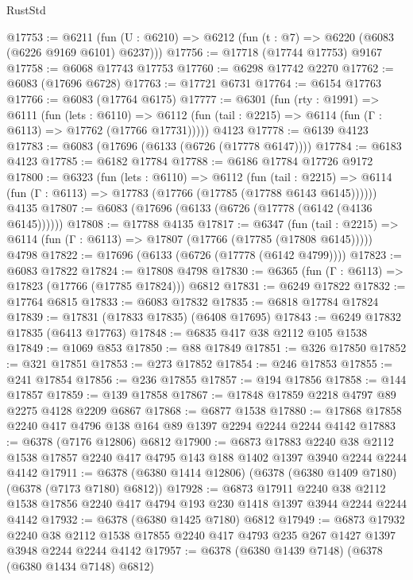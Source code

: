 \begin{lexlean}{RustStd}
\begin{coremodule}
@17753 := @6211 (fun (U : @6210) => @6212 (fun (t : @7) => @6220 (@6083 (@6226 @9169 @6101) @6237)))
@17756 := @17718 (@17744 @17753) @9167
@17758 := @6068 @17743 @17753
@17760 := @6298 @17742 @2270
@17762 := @6083 (@17696 @6728)
@17763 := @17721 @6731
@17764 := @6154 @17763
@17766 := @6083 (@17764 @6175)
@17777 := @6301
    (fun (rty : @1991) =>
    @6111
      (fun (lets : @6110) =>
      @6112 (fun (tail : @2215) => @6114 (fun (Γ : @6113) => @17762 (@17766 @17731)))))
    @4123
@17778 := @6139 @4123
@17783 := @6083 (@17696 (@6133 (@6726 (@17778 @6147))))
@17784 := @6183 @4123
@17785 := @6182 @17784
@17788 := @6186 @17784 @17726 @9172
@17800 := @6323
    (fun (lets : @6110) =>
    @6112
      (fun (tail : @2215) =>
      @6114 (fun (Γ : @6113) => @17783 (@17766 (@17785 (@17788 @6143 @6145))))))
    @4135
@17807 := @6083 (@17696 (@6133 (@6726 (@17778 (@6142 (@4136 @6145))))))
@17808 := @17788 @4135
@17817 := @6347
    (fun (tail : @2215) => @6114 (fun (Γ : @6113) => @17807 (@17766 (@17785 (@17808 @6145)))))
    @4798
@17822 := @17696 (@6133 (@6726 (@17778 (@6142 @4799))))
@17823 := @6083 @17822
@17824 := @17808 @4798
@17830 := @6365 (fun (Γ : @6113) => @17823 (@17766 (@17785 @17824))) @6812
@17831 := @6249 @17822
@17832 := @17764 @6815
@17833 := @6083 @17832
@17835 := @6818 @17784 @17824
@17839 := @17831 (@17833 @17835) (@6408 @17695)
@17843 := @6249 @17832 @17835 (@6413 @17763)
@17848 := @6835 @417 @38 @2112 @105 @1538
@17849 := @1069 @853
@17850 := @88 @17849
@17851 := @326 @17850
@17852 := @321 @17851
@17853 := @273 @17852
@17854 := @246 @17853
@17855 := @241 @17854
@17856 := @236 @17855
@17857 := @194 @17856
@17858 := @144 @17857
@17859 := @139 @17858
@17867 := @17848 @17859 @2218 @4797 @89 @2275 @4128 @2209 @6867
@17868 := @6877 @1538
@17880 := @17868 @17858 @2240 @417 @4796 @138 @164 @89 @1397 @2294 @2244 @2244 @4142
@17883 := @6378 (@7176 @12806) @6812
@17900 := @6873
    @17883
    @2240
    @38
    @2112
    @1538
    @17857
    @2240
    @417
    @4795
    @143
    @188
    @1402
    @1397
    @3940
    @2244
    @2244
    @4142
@17911 := @6378 (@6380 @1414 @12806) (@6378 (@6380 @1409 @7180) (@6378 (@7173 @7180) @6812))
@17928 := @6873
    @17911
    @2240
    @38
    @2112
    @1538
    @17856
    @2240
    @417
    @4794
    @193
    @230
    @1418
    @1397
    @3944
    @2244
    @2244
    @4142
@17932 := @6378 (@6380 @1425 @7180) @6812
@17949 := @6873
    @17932
    @2240
    @38
    @2112
    @1538
    @17855
    @2240
    @417
    @4793
    @235
    @267
    @1427
    @1397
    @3948
    @2244
    @2244
    @4142
@17957 := @6378 (@6380 @1439 @7148) (@6378 (@6380 @1434 @7148) @6812)

\end{coremodule}
\end{lexlean}
